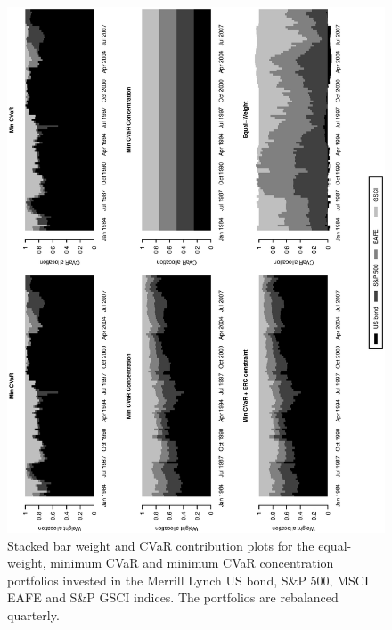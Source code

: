 \documentclass[11pt]{article}
\begin{document}
\begin{figure}[tb]
\caption{Stacked bar weight and CVaR contribution plots for the equal-weight, minimum CVaR and minimum CVaR concentration portfolios invested in the Merrill Lynch US bond, S\&P 500, MSCI EAFE and S\&P GSCI indices. The portfolios are rebalanced quarterly.}
\includegraphics[width=12cm,angle=270]{stackedweightsriskcont_benchmark.eps}
\end{figure}

\newpage
\end{document}
